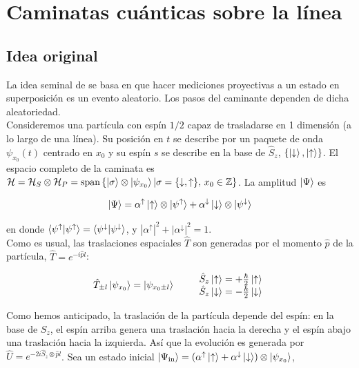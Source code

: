 \chapter{Caminatas cuánticas sobre la línea}

\section{Idea original}\label{IdeaOriginal}
La idea seminal de \cite{aharonov2001quantum} se basa en que hacer mediciones proyectivas a un estado en superposición es un evento aleatorio. Los pasos del caminante dependen de dicha aleatoriedad.\\

Consideremos una partícula con espín $1/2$ capaz de trasladarse en 1 dimensión (a lo largo de una línea). Su posición en $t$ se describe por un paquete de onda $\psi_{x_0}(t)$ centrado en $x_0$ y su espín $s$ se describe en la base de $\hat{S}_z$, $\{\ket{\downarrow},\ket{\uparrow}\}$. 
El espacio completo de la caminata es $\mathcal{H}=\mathcal{H}_S\otimes\mathcal{H}_P=\text{span}\left\{\ket{\sigma}\otimes \ket{\psi_{x_0}}|\sigma=\{\downarrow,\uparrow\},\,x_0\in \mathbb{Z}\right\}$. La amplitud $\ket{\Psi}$ es

\begin{equation}
    \ket{\Psi}=\alpha^{\uparrow}\ket{\uparrow}\otimes\ket{\psi^\uparrow}+\alpha^\downarrow\ket{\downarrow}\otimes\ket{\psi^\downarrow}
\end{equation}{}

en donde $\braket{\psi^\uparrow|\psi^\uparrow}=\braket{\psi^\downarrow|\psi^\downarrow}$, y $|\alpha^\uparrow|^2+|\alpha^\downarrow|^2=1$.\\

Como es usual, las traslaciones espaciales $\hat{T}$ son generadas por el momento $\hat{p}$ de la partícula, $\hat{T}=e^{-i\hat{p}l}$:

\begin{equation}
    \hat{T}_{\pm l}\ket{\psi_{x_0}}=\ket{\psi_{x_0 \pm l}}\qquad
    \begin{array}{cc}
    \hat{S}_z\ket{\uparrow}=+\frac{\hbar}{2}\ket{\uparrow}\\
    \hat{S}_z\ket{\downarrow}=-\frac{\hbar}{2}\ket{\downarrow}
    \end{array}
\end{equation}

Como hemos anticipado, la traslación de la partícula depende del espín: en la base de $S_z$, el espín arriba genera una traslación hacia la derecha y el espín abajo una traslación hacia la izquierda. Así que la evolución es generada por $\hat{U}=e^{-2i\hat{S}_z\otimes \hat{p}l}$. Sea un estado inicial $\ket{\Psi_{\text{in}}}=(\alpha^{\uparrow}\ket{\uparrow}+\alpha^{\downarrow}\ket{\downarrow})\otimes\ket{\psi_{x_0}}$,

